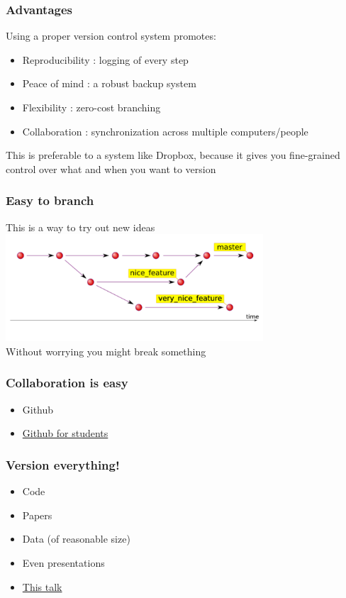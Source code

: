 \documentclass{beamer}
\begin{document}
\begin{frame}
\frametitle{Advantages}
Using a proper version control system promotes:
\begin{itemize}
\pause
\item
Reproducibility : logging of every step
\pause
\item
Peace of mind : a robust backup system
\pause
\item
Flexibility : zero-cost branching
\pause
\item
Collaboration : synchronization across multiple computers/people
\end{itemize}
\pause
This is preferable to a system like Dropbox, because it gives you fine-grained
control over what and when you want to version
\end{frame}


\begin{frame}
\frametitle{Easy to branch}
This is a way to try out new ideas
\includegraphics[height=4cm]{figures/git2.pdf}
\pause
\\
Without worrying you might break something
\end{frame}



\begin{frame}
\frametitle{Collaboration is easy}
\begin{itemize}
\pause
\item
Github 
\pause
\item
\href{https://education.github.com/}{Github for students}
\end{itemize}
\end{frame}


\begin{frame}
\frametitle{Version everything!}
\begin{itemize}
\pause
\item
Code
\pause
\item
Papers
\pause
\item
Data (of reasonable size)
\pause 
\item
Even presentations
\pause
\item
\href{https://github.com/arokem/frisem-20141016}{This talk}
\end{itemize}
\end{frame}
\end{document}
